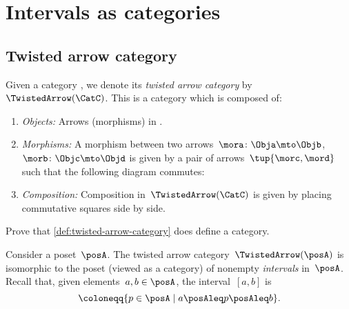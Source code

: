 
\section{Intervals as categories}

\subsection{Twisted arrow category}

\begin{ctdefinition}
    \label{def:twisted-arrow-category}
    \label{def:twisted-arrow}
    Given a category \CatC, we denote its \emph{twisted arrow category} by~$\TwistedArrow(\CatC)$.
    This is a category which is composed of:
    \begin{enumerate}
        \item \emph{Objects:} Arrows (morphisms) in \CatC.
        \item \emph{Morphisms:} A morphism between two arrows~$\mora\colon \Obja \mto \Objb $,~$\morb\colon \Objc \mto \Objd$ is given by a pair of arrows~$\tup{\morc,\mord}$ such that the following diagram commutes:
              \begin{center}
              \end{center}
        \item \emph{Composition:} Composition in~$\TwistedArrow(\CatC)$ is given by placing commutative squares side by side.
    \end{enumerate}
\end{ctdefinition}

\begin{gradedexercise}
    \label{ex:TwistedCat}
    Prove that \cref{def:twisted-arrow-category} does define a category.
\end{gradedexercise}


\begin{example}[Intervals]
    \label{exa:twisted-arrow-poset}
    Consider a poset~$\posA$.
    The twisted arrow category~$\TwistedArrow(\posA)$ is isomorphic to the poset (viewed as a category) of nonempty \emph{intervals} in~$\posA$.
     Recall that, given elements~$a, b \in \posA$, the interval~$[a,b]$ is
    \begin{equation*}
        [a,b]
        \coloneqq \{p \in \posA \mid a\posAleq p \posAleq b\}.
    \end{equation*}
\end{example}

